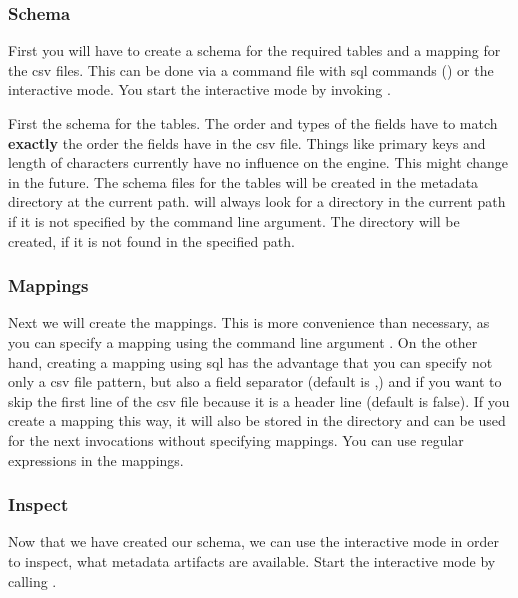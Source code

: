 \subsubsection{Schema}
First you will have to create a schema for the required tables and a mapping for the csv files. This can be done via a command file with sql commands () or the interactive mode. You start the interactive mode by invoking .

First the schema for the tables. The order and types of the fields have to match \textbf{exactly} the order the fields have in the csv file. Things like primary keys and length of characters currently have no influence on the engine. This might change in the future. The schema files for the tables will be created in the  metadata directory at the current path. \csvsqldb{} will always look for a  directory in the current path if it is not specified by the  command line argument. The  directory will be created, if it is not found in the specified path.


\subsubsection{Mappings}
Next we will create the mappings. This is more convenience than necessary, as you can specify a mapping using the command line argument . On the other hand, creating a mapping using sql has the advantage that you can specify not only a csv file pattern, but also a field separator (default is ,) and if you want to skip the first line of the csv file because it is a header line (default is false). If you create a mapping this way, it will also be stored in the  directory and can be used for the next \csvsqldb{} invocations without specifying mappings. You can use regular expressions in the mappings.


\subsubsection{Inspect}
Now that we have created our schema, we can use the interactive mode in order to inspect, what metadata artifacts are available. Start the interactive mode by calling .

